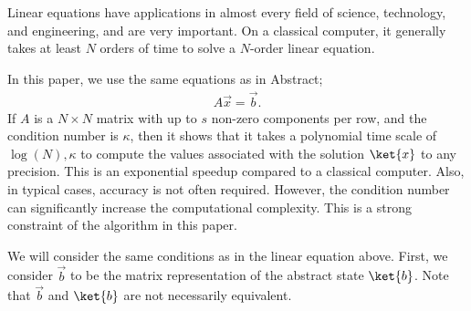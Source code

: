 \documentclass[b5paper,papersize,dvipdfmx,fleqn]{article}
\begin{document}

Linear equations have applications in almost every field of science, technology, and engineering, and are very important\cite{Harrow2009}. On a classical computer, it generally takes at least $N$ orders of time to solve a $N$-order linear equation.


In this paper, we use the same equations as in Abstract;
\begin{eqnarray}
  A\vec{x} = \vec{b}.
\end{eqnarray}
If $A$ is a $N\times N$ matrix with up to $s$ non-zero components per row, and the condition number is $\kappa $, then it shows that it takes a polynomial time scale of $\log(N),\kappa $ to compute the values associated with the solution $\ket{x}$ to any precision. This is an exponential speedup compared to a classical computer. Also, in typical cases, accuracy is not often required. However, the condition number can significantly increase the computational complexity. This is a strong constraint of the algorithm in this paper.

We will consider the same conditions as in the linear equation above. First, we consider $\vec{b}$ to be the matrix representation of the abstract state $\ket{b}$. Note that $\vec{b}$ and $\ket{b}$ are not necessarily equivalent.

%

\end{document}
